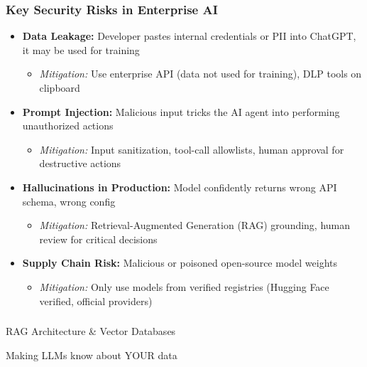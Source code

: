 \begin{frame}[fragile]\frametitle{Key Security Risks in Enterprise AI}
\begin{itemize}
\item \textbf{Data Leakage:} Developer pastes internal credentials or PII into ChatGPT, it may be used for training
  \begin{itemize}
  \item \textit{Mitigation:} Use enterprise API (data not used for training), DLP tools on clipboard
  \end{itemize}
\item \textbf{Prompt Injection:} Malicious input tricks the AI agent into performing unauthorized actions
  \begin{itemize}
  \item \textit{Mitigation:} Input sanitization, tool-call allowlists, human approval for destructive actions
  \end{itemize}
\item \textbf{Hallucinations in Production:} Model confidently returns wrong API schema, wrong config
  \begin{itemize}
  \item \textit{Mitigation:} Retrieval-Augmented Generation (RAG) grounding, human review for critical decisions
  \end{itemize}
\item \textbf{Supply Chain Risk:} Malicious or poisoned open-source model weights
  \begin{itemize}
  \item \textit{Mitigation:} Only use models from verified registries (Hugging Face verified, official providers)
  \end{itemize}
\end{itemize}
\end{frame}

\begin{frame}[fragile]\frametitle{}
\begin{center}
{\Large RAG Architecture \& Vector Databases}

{\small Making LLMs know about YOUR data}
\end{center}
\end{frame}

